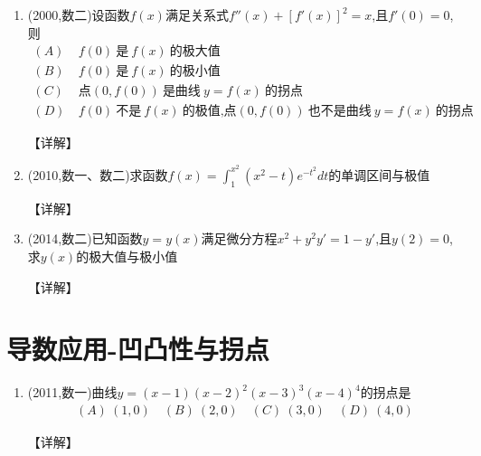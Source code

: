 \documentclass[12pt, a4paper, oneside, UTF8]{ctexbook}
\begin{document}
\begin{enumerate}[label=\arabic*.,start=17]
    \item  (2000,数二)设函数$f(x)$满足关系式$f''(x)+[f'(x)]^2=x$,且$f'(0)=0$,则
    \begin{align*}
        (A)&\ f(0)\ \text{是}\ f(x)\ \text{的极大值} \\
        (B)&\ f(0)\ \text{是}\ f(x)\ \text{的极小值} \\
        (C)&\ \text{点}(0,f(0))\ \text{是曲线}\ y=f(x)\ \text{的拐点} \\
        (D)&\ f(0)\ \text{不是}\ f(x)\ \text{的极值,点}(0,f(0))\ \text{也不是曲线}\ y=f(x)\ \text{的拐点}
    \end{align*}
    
    \begin{solution}
    【详解】
    \end{solution}
    
    \item  (2010,数一、数二)求函数$f(x)=\int_1^{x^2}(x^2-t)e^{-t^2}dt$的单调区间与极值
    
    \begin{solution}
    【详解】
    \end{solution}
    
    \item  (2014,数二)已知函数$y=y(x)$满足微分方程$x^2+y^2y'=1-y'$,且$y(2)=0$,求$y(x)$的极大值与极小值
    
    \begin{solution}
    【详解】
    \end{solution}
\end{enumerate}

\section{导数应用-凹凸性与拐点}

\begin{enumerate}[label=\arabic*.,start=20]
    \item  (2011,数一)曲线$y=(x-1)(x-2)^2(x-3)^3(x-4)^4$的拐点是
    \begin{align*}
        (A)\ (1,0) \quad (B)\ (2,0) \quad (C)\ (3,0) \quad (D)\ (4,0)
    \end{align*}
    
    \begin{solution}
    【详解】
    \end{solution}
\end{enumerate}
\end{document}
